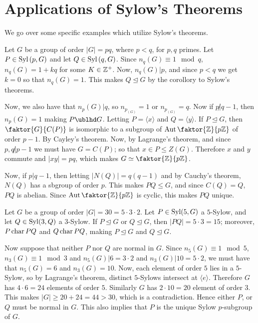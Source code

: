 \section{Applications of Sylow's Theorems}
\label{section_4.6}

We go over some specific examples which utilize Sylow's theorems.

\begin{example}\label{example_4.14}
  Let $G$ be a group of order $|G|=pq$, where $p<q$, for  $p,q$ primes.
  Let  $P \in \operatorname{Syl}{(p,G)}$ and let $Q \in \operatorname{Syl}{(q,G)}$. Since $n_q(G) \equiv 1
  \mod{q}$, $n_q(G)=1+kq$ for some $K \in \mathbb{Z}^+$. Now,  $n_q(G)|p$, and since
  $p<q$ we get  $k=0$ so that  $n_q(G)=1$. This makes $Q \unlhd G$ by the
  corollory to Sylow's theorems.

  Now, we also have that  $n_p(G)|q$, so $n_p_(G)=1$ or $n_p_(G)=q$. Now if $p
  \not| q-1$, then  $n_p(G)=1$ making $P \ublhd G$. Letting  $P=\langle x
  \rangle$ and $Q=\langle y \rangle$. If $P \unlhd G$, then
  $\faktor{G}{C(P)}$ is isomorphic to a subgroup of $\Aut{\faktor{\Z}{p\Z}}$
  of order $p-1$. By Cayley's theorem. Now, by Lagrange's theorem, and since
  $p,q \not| p-1$ we must have  $G=C(P)$; so that $x \in P \leq Z(G)$.
  Therefore $x$ and $y$ commute and  $|xy|=pq$, which makes $G \simeq
  \faktor{\Z}{p\Z}$.

  Now, if $p|q-1$, then letting $|N(Q)|=q(q-1)$ and by Cauchy's theorem,
  $N(Q)$ has a sbgroup of order $p$. This makes $PQ \leq G$, and since
  $C(Q)=Q$, $PQ$ is abelian. Since  $\Aut{\faktor{\Z}{p\Z}}$ is cyclic, this
  makes $PQ$ unique.
\end{example}

\begin{example}\label{example_4.15}
  Let $G$ be a group of order  $|G|=30=5 \cdot 3 \cdot 2$. Let $P \in
  \operatorname{Syl}(5,G)$ a $5$-Sylow, and let  $Q \in \operatorname{Syl}(3,Q)$ a $3$-Sylow. If  $P
  \unlhd G$ or  $Q \unlhd G$, then  $|PQ|=5 \cdot 3=15$; moreover, $P
  \operatorname{char}{PQ}$ and $Q \operatorname{char}{PQ}$, making $P \unlhd G$ and  $Q \unlhd G$.

  Now suppose that neither $P$ nor $Q$ are normal in $G$. Since $n_5(G) \equiv
  1 \mod{5}$, $n_3(G) \equiv 1 \mod{3}$ and $n_5(G)|6=3 \cdot 2$ and
  $n_3(G)|10=5 \cdot 2$, we must have that $n_5(G)=6$ and $n_3(G)=10$. Now,
  each element of order $5$ lies in a $5$-Sylow, so by Lagrange's theorem,
  distinct $5$-Sylows intersect at  $\langle e \rangle$. Therefore $G$ has $4
  \cdot 6=24$ elements of order $5$. Similarly $G$ has $2 \cdot 10=20$ element
  of order $3$. This makes $|G| \geq 20+24=44>30$, which is a contradiction.
  Hence either $P$, or  $Q$ must be normal in $G$. This also implies that $P$
  is the unique Sylow $p$-subgroup of $G$.
\end{example}


